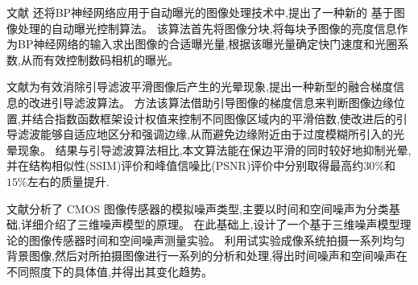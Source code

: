 \documentclass{amsart}
\begin{document}
文献 \cite{徐培风}还将BP神经网络应用于自动曝光的图像处理技术中,提出了一种新的
基于图像处理的自动曝光控制算法。
该算法首先将图像分块,将每块予图像的亮度信息作为BP神经网络的输入求出图像的合适曝光量,根据该曝光量确定快门速度和光圈系数,从而有效控制数码相机的曝光。


文献\cite{谢伟}为有效消除引导滤波平滑图像后产生的光晕现象,提出一种新型的融合梯度信息的改进引导滤波算法。
方法该算法借助引导图像的梯度信息来判断图像边缘位置,并结合指数函数框架设计权值来控制不同图像区域内的平滑倍数,使改进后的引导滤波能够自适应地区分和强调边缘,从而避免边缘附近由于过度模糊所引入的光晕现象。
结果与引导滤波算法相比,本文算法能在保边平滑的同时较好地抑制光晕,并在结构相似性(SSIM)评价和峰值信噪比(PSNR)评价中分别取得最高约$30\%$和$15\%$左右的质量提升.

文献\cite{和文娟}分析了 CMOS 图像传感器的模拟噪声类型,主要以时间和空间噪声为分类基础,详细介绍了三维噪声模型的原理。
在此基础上,设计了一个基于三维噪声模型理论的图像传感器时间和空间噪声测量实验。
利用试实验成像系统拍摄一系列均匀背景图像,然后对所拍摄图像进行一系列的分析和处理,得出时间噪声和空间噪声在不同照度下的具体值,并得出其变化趋势。
\end{document}
